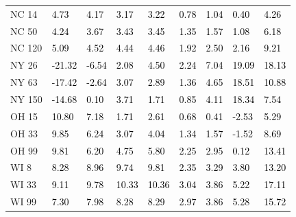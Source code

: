 \begin{tabular}{lllllllll}
NC 14 & \textcolor{black}{ 4.73 } & \textcolor{black}{ 4.17 } & \textcolor{black}{ 3.17 } & \textcolor{black}{ 3.22 } & \textcolor{black}{ 0.78 } & \textcolor{black}{ 1.04 } & \textcolor{black}{ 0.40 } & \textcolor{black}{ 4.26 } \\
NC 50 & \textcolor{black}{ 4.24 } & \textcolor{black}{ 3.67 } & \textcolor{black}{ 3.43 } & \textcolor{black}{ 3.45 } & \textcolor{black}{ 1.35 } & \textcolor{black}{ 1.57 } & \textcolor{black}{ 1.08 } & \textcolor{black}{ 6.18 } \\
NC 120 & \textcolor{black}{ 5.09 } & \textcolor{black}{ 4.52 } & \textcolor{black}{ 4.44 } & \textcolor{black}{ 4.46 } & \textcolor{black}{ 1.92 } & \textcolor{black}{ 2.50 } & \textcolor{black}{ 2.16 } & \textcolor{black}{ 9.21 } \\
NY 26 & \textcolor{black}{ -21.32 } & \textcolor{black}{ -6.54 } & \textcolor{black}{ 2.08 } & \textcolor{black}{ 4.50 } & \textcolor{black}{ 2.24 } & \textcolor{black}{ 7.04 } & \textcolor{black}{ 19.09 } & \textcolor{black}{ 18.13 } \\
NY 63 & \textcolor{black}{ -17.42 } & \textcolor{black}{ -2.64 } & \textcolor{black}{ 3.07 } & \textcolor{black}{ 2.89 } & \textcolor{black}{ 1.36 } & \textcolor{black}{ 4.65 } & \textcolor{black}{ 18.51 } & \textcolor{black}{ 10.88 } \\
NY 150 & \textcolor{black}{ -14.68 } & \textcolor{black}{ 0.10 } & \textcolor{black}{ 3.71 } & \textcolor{black}{ 1.71 } & \textcolor{black}{ 0.85 } & \textcolor{black}{ 4.11 } & \textcolor{black}{ 18.34 } & \textcolor{black}{ 7.54 } \\
OH 15 & \textcolor{black}{ 10.80 } & \textcolor{black}{ 7.18 } & \textcolor{black}{ 1.71 } & \textcolor{black}{ 2.61 } & \textcolor{black}{ 0.68 } & \textcolor{black}{ 0.41 } & \textcolor{black}{ -2.53 } & \textcolor{black}{ 5.29 } \\
OH 33 & \textcolor{black}{ 9.85 } & \textcolor{black}{ 6.24 } & \textcolor{black}{ 3.07 } & \textcolor{black}{ 4.04 } & \textcolor{black}{ 1.34 } & \textcolor{black}{ 1.57 } & \textcolor{black}{ -1.52 } & \textcolor{black}{ 8.69 } \\
OH 99 & \textcolor{black}{ 9.81 } & \textcolor{black}{ 6.20 } & \textcolor{black}{ 4.75 } & \textcolor{black}{ 5.80 } & \textcolor{black}{ 2.25 } & \textcolor{black}{ 2.95 } & \textcolor{black}{ 0.12 } & \textcolor{black}{ 13.41 } \\
WI 8 & \textcolor{black}{ 8.28 } & \textcolor{black}{ 8.96 } & \textcolor{black}{ 9.74 } & \textcolor{black}{ 9.81 } & \textcolor{black}{ 2.35 } & \textcolor{black}{ 3.29 } & \textcolor{black}{ 3.80 } & \textcolor{black}{ 13.20 } \\
WI 33 & \textcolor{black}{ 9.11 } & \textcolor{black}{ 9.78 } & \textcolor{black}{ 10.33 } & \textcolor{black}{ 10.36 } & \textcolor{black}{ 3.04 } & \textcolor{black}{ 3.86 } & \textcolor{black}{ 5.22 } & \textcolor{black}{ 17.11 } \\
WI 99 & \textcolor{black}{ 7.30 } & \textcolor{black}{ 7.98 } & \textcolor{black}{ 8.28 } & \textcolor{black}{ 8.29 } & \textcolor{black}{ 2.97 } & \textcolor{black}{ 3.86 } & \textcolor{black}{ 5.28 } & \textcolor{black}{ 15.72 } \\
\bottomrule
\end{tabular}
